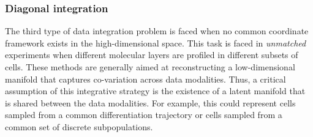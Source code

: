 


\subsubsection{Diagonal integration}

The third type of data integration problem is faced when no common coordinate framework exists in the high-dimensional space. This task is faced in \textit{unmatched} experiments when different molecular layers are profiled in different subsets of cells. These methods are generally aimed at reconstructing a low-dimensional manifold that captures co-variation across data modalities. Thus, a critical assumption of this integrative strategy is the existence of a latent manifold that is shared between the data modalities. For example, this could represent cells sampled from a common differentiation trajectory or cells sampled from a common set of discrete subpopulations.

